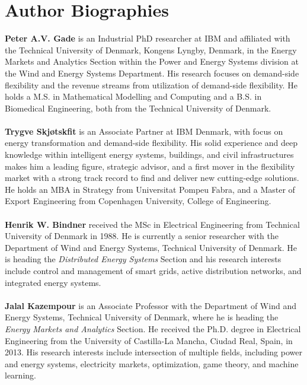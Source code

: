 \documentclass[11pt,a4paper]{article}
\begin{document}







%
\printbibliography


\section*{Author Biographies}

\textbf{Peter A.V. Gade} is an Industrial PhD researcher at IBM and affiliated with the Technical University of Denmark, Kongens Lyngby, Denmark, in the Energy Markets and Analytics Section within the Power and Energy Systems division at the Wind and Energy Systems Department. His research focuses on demand-side flexibility and the revenue streams from utilization of demand-side flexibility. He holds a M.S. in Mathematical Modelling and Computing and a B.S. in Biomedical Engineering, both from the Technical University of Denmark.
\\
\\
\textbf{Trygve Skjøtskfit} is an Associate Partner at IBM Denmark, with focus on energy transformation and demand-side flexibility. His solid experience and deep knowledge within intelligent energy systems, buildings, and civil infrastructures makes him a leading figure, strategic advisor, and a first mover in the flexibility market with a strong track record to find and deliver new cutting-edge solutions. He holds an MBA in Strategy from Universitat Pompeu Fabra, and a Master of Export Engineering from Copenhagen University, College of Engineering.
\\
\\
\textbf{Henrik W. Bindner} received the MSc in Electrical Engineering from Technical University of Denmark in 1988. He is currently a senior researcher with the Department of Wind and Energy Systems, Technical University of Denmark. He is heading the \textit{Distributed Energy Systems} Section and his research interests include control and management of smart grids, active distribution networks, and integrated energy systems.
\\
\\
\textbf{Jalal Kazempour}  is an Associate Professor with the Department of Wind and Energy Systems, Technical University of Denmark, where he is heading the \textit{Energy Markets and Analytics} Section. He received the Ph.D. degree in Electrical Engineering from the University of Castilla-La Mancha, Ciudad Real, Spain, in 2013. His research interests include intersection of multiple fields, including power and energy systems, electricity markets, optimization, game theory, and machine learning.
\end{document}
